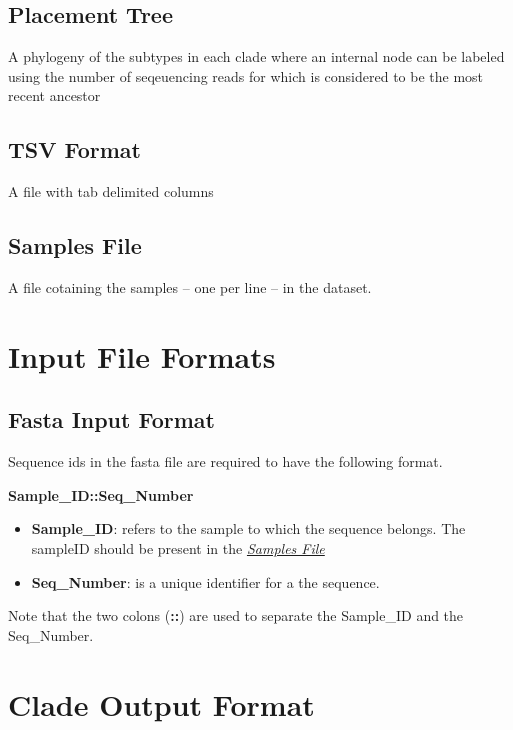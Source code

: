 \documentclass[letterpaper,10pt,english]{sphinxmanual}
\begin{document}
\subsection{Placement Tree}
\label{defs:placement-tree}
A phylogeny of the subtypes in each clade where an internal node can be labeled using the number of seqeuencing reads for which is considered to be the most recent ancestor


\subsection{TSV Format}
\label{defs:tsv}\label{defs:tsv-format}
A file with tab delimited columns


\subsection{Samples File}
\label{defs:samples-file}\label{defs:samplefile}
A file cotaining the samples -- one per line -- in the dataset.


\section{Input File Formats}
\label{defs:input-file-formats}

\subsection{Fasta Input Format}
\label{defs:fasta-input-format}\label{defs:inputformat}
Sequence ids in the fasta file are required to have the following format.

\textbf{Sample\_ID::Seq\_Number}
\begin{itemize}
\item {} 
\textbf{Sample\_ID}: refers to the sample to which the sequence belongs. The sampleID should be present in the {\hyperref[defs:samplefile]{\emph{Samples File}}}

\item {} 
\textbf{Seq\_Number}: is a unique identifier for a the sequence.

\end{itemize}

Note that the two colons (\textbf{::}) are used to separate the Sample\_ID and the Seq\_Number.


\section{Clade Output Format}
\label{defs:clade-output-format}
\end{document}
